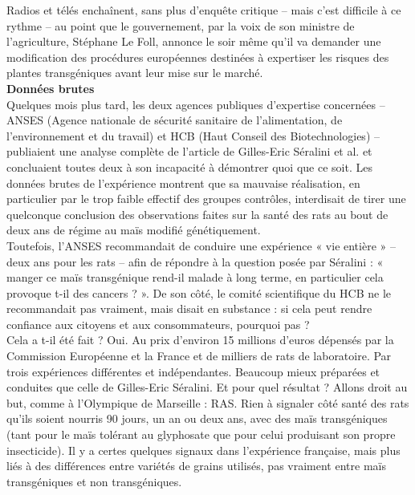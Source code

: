 \documentclass[8pt]{article}
\begin{document}
Radios et télés enchaînent, sans plus d’enquête critique – mais c’est difficile à ce rythme – au point que le gouvernement, par la voix de son ministre de l’agriculture, Stéphane Le Foll, annonce le soir même qu’il va demander une modification des procédures européennes destinées à expertiser les risques des plantes transgéniques avant leur mise sur le marché.\\

\textbf{Données brutes}\\

Quelques mois plus tard, les deux agences publiques d’expertise concernées – ANSES (Agence nationale de sécurité sanitaire de l'alimentation, de l'environnement et du travail) et HCB (Haut Conseil des Biotechnologies) – publiaient une analyse complète de l’article de Gilles-Eric Séralini et al. et concluaient toutes deux à son incapacité à démontrer quoi que ce soit. Les données brutes de l’expérience montrent que sa mauvaise réalisation, en particulier par le trop faible effectif des groupes contrôles, interdisait de tirer une quelconque conclusion des observations faites sur la santé des rats au bout de deux ans de régime au maïs modifié génétiquement.\\

Toutefois, l’ANSES recommandait de conduire une expérience « vie entière » – deux ans pour les rats – afin de répondre à la question posée par Séralini : « manger ce maïs transgénique rend-il malade à long terme, en particulier cela provoque t-il des cancers ? ». De son côté, le comité scientifique du HCB ne le recommandait pas vraiment, mais disait en substance : si cela peut rendre confiance aux citoyens et aux consommateurs, pourquoi pas ?\\

Cela a t-il été fait ? Oui. Au prix d’environ 15 millions d’euros dépensés par la Commission Européenne et la France et de milliers de rats de laboratoire. Par trois expériences différentes et indépendantes. Beaucoup mieux préparées et conduites que celle de Gilles-Eric Séralini. Et pour quel résultat ? Allons droit au but, comme à l’Olympique de Marseille : RAS. Rien à signaler côté santé des rats qu’ils soient nourris 90 jours, un an ou deux ans, avec des maïs transgéniques (tant pour le maïs tolérant au glyphosate que pour celui produisant son propre insecticide). Il y a certes quelques signaux dans l’expérience française, mais plus liés à des différences entre variétés de grains utilisés, pas vraiment entre maïs transgéniques et non transgéniques.\\
\end{document}
